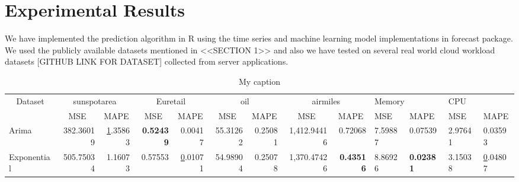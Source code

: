 \section{Experimental Results}

We have implemented the prediction algorithm in R using the time series and machine learning model implementations in forecast package. We used the publicly available datasets mentioned in <<SECTION 1>> and also we have tested on several real world cloud workload datasets [GITHUB LINK FOR DATASET] collected from server applications.

\begin{table}[]
\centering
\caption{My caption}
\label{my-label}
\begin{tabular}{@{}lrrrrrrrrllll@{}}
\toprule
\multicolumn{1}{c}{\multirow{2}{*}{Dataset}} & \multicolumn{2}{c}{sunspotarea}                                                      & \multicolumn{2}{c}{Euretail}                                                 & \multicolumn{2}{c}{oil}                                                       & \multicolumn{2}{c}{airmiles}                                                     & \multicolumn{2}{l}{Memory}                                                    & \multicolumn{2}{l}{CPU}                                                       \\ \cmidrule(l){2-13} 
\multicolumn{1}{c}{}                         & \multicolumn{1}{c|}{MSE}                      & \multicolumn{1}{c|}{MAPE}            & \multicolumn{1}{c|}{MSE}              & \multicolumn{1}{c|}{MAPE}            & \multicolumn{1}{c|}{MSE}              & \multicolumn{1}{c|}{MAPE}             & \multicolumn{1}{c|}{MSE}                 & \multicolumn{1}{c|}{MAPE}             & \multicolumn{1}{l|}{MSE}              & \multicolumn{1}{l|}{MAPE}             & \multicolumn{1}{l|}{MSE}              & \multicolumn{1}{l|}{MAPE}             \\ \midrule
\multicolumn{1}{|l|}{Arima}                  & \multicolumn{1}{r|}{382.36019}                & \multicolumn{1}{r|}{{\ul 1.35863}}   & \multicolumn{1}{r|}{\textbf{0.52439}} & \multicolumn{1}{r|}{0.00417}         & \multicolumn{1}{r|}{55.31262}         & \multicolumn{1}{r|}{0.25081}          & \multicolumn{1}{r|}{1,412.94416}         & \multicolumn{1}{r|}{0.72068}          & \multicolumn{1}{l|}{7.59887}          & \multicolumn{1}{l|}{0.07539}          & \multicolumn{1}{l|}{2.97641}          & \multicolumn{1}{l|}{0.03593}          \\ \midrule
\multicolumn{1}{|l|}{Exponential}            & \multicolumn{1}{r|}{505.75034}                & \multicolumn{1}{r|}{1.16073}         & \multicolumn{1}{r|}{0.57553}          & \multicolumn{1}{r|}{{\ul 0.01071}}   & \multicolumn{1}{r|}{54.98904}         & \multicolumn{1}{r|}{0.25078}          & \multicolumn{1}{r|}{1,370.47426}         & \multicolumn{1}{r|}{\textbf{0.43516}} & \multicolumn{1}{l|}{8.86926}          & \multicolumn{1}{l|}{\textbf{0.02381}} & \multicolumn{1}{l|}{3.15038}          & \multicolumn{1}{l|}{{\ul 0.04807}}    \\ \midrule

\end{tabular}
\end{table}
